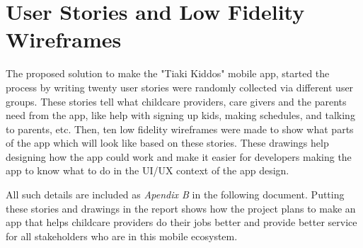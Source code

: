 \section{User Stories and Low Fidelity Wireframes }

The proposed solution to make the "Tiaki Kiddos" mobile app, started the process by writing twenty user stories were randomly collected via different user groups. These stories tell what childcare providers, care givers and the parents need from the app, like help with signing up kids, making schedules, and talking to parents, etc. Then, ten low fidelity wireframes were made to show what parts of the app which will look like based on these stories. These drawings help designing how the app could work and make it easier for developers making the app to know what to do in the UI/UX context of the app design. 

\par 

All such details are included as \emph{Apendix B} in the following document. Putting these stories and drawings in the report shows how the project plans to make an app that helps childcare providers do their jobs better and provide better service for all stakeholders who are in this mobile ecosystem.